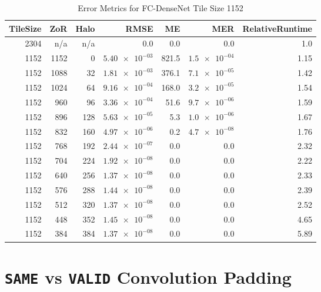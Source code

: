 \documentclass[10pt, indentfirst]{article}
\begin{document}
\begin{table}[h!]
	\centering
	\caption{Error Metrics for FC-DenseNet Tile Size 1152}
	\label{tab:tile_size_1152}
	\begin{tabular}{r|r|r|r|r|r|r}
		TileSize & ZoR & Halo & RMSE    & ME & MER & RelativeRuntime \\ 
		\hline
		2304 & n/a & n/a & 0.0 & 0.0 & 0.0 & 1.0 \\
		1152 & 1152 & 0 & $\num{5.40e-03}$ & 821.5 & $\num{1.5e-04}$ & 1.15 \\
		1152 & 1088 & 32 & $\num{1.81e-03}$ & 376.1 & $\num{7.1e-05}$ & 1.42 \\
		1152 & 1024 & 64 & $\num{9.16e-04}$ & 168.0 & $\num{3.2e-05}$ & 1.54 \\
		1152 & 960 & 96 & $\num{3.36e-04}$ & 51.6 & $\num{9.7e-06}$ & 1.59 \\
		1152 & 896 & 128 & $\num{5.63e-05}$ & 5.3 & $\num{1.0e-06}$ & 1.67 \\
		1152 & 832 & 160 & $\num{4.97e-06}$ & 0.2 & $\num{4.7e-08}$ & 1.76 \\
		1152 & 768 & 192 & $\num{2.44e-07}$ & 0.0 & 0.0 & 2.32 \\
		1152 & 704 & 224 & $\num{1.92e-08}$ & 0.0 & 0.0 & 2.22 \\
		1152 & 640 & 256 & $\num{1.37e-08}$ & 0.0 & 0.0 & 2.33 \\
		1152 & 576 & 288 & $\num{1.44e-08}$ & 0.0 & 0.0 & 2.39 \\
		1152 & 512 & 320 & $\num{1.37e-08}$ & 0.0 & 0.0 & 2.52 \\
		1152 & 448 & 352 & $\num{1.45e-08}$ & 0.0 & 0.0 & 4.65 \\
		1152 & 384 & 384 & $\num{1.37e-08}$ & 0.0 & 0.0 & 5.89 \\
	\end{tabular}
\end{table}

\section{\texttt{SAME}  vs \texttt{VALID} Convolution Padding}
\end{document}
